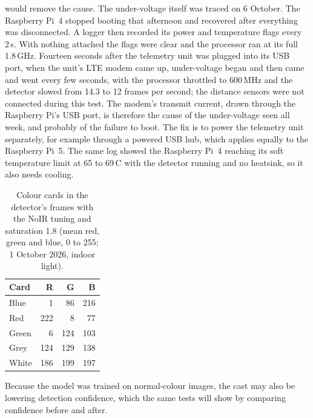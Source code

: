 would remove the cause. The under-voltage itself was traced on 6 October. The Raspberry Pi~4 stopped booting that afternoon and recovered after everything was disconnected. A logger then recorded its power and temperature flags every 2\,s. With nothing attached the flags were clear and the processor ran at its full 1.8\,GHz. Fourteen seconds after the telemetry unit was plugged into its USB port, when the unit's LTE modem came up, under-voltage began and then came and went every few seconds, with the processor throttled to 600\,MHz and the detector slowed from 14.3 to 12 frames per second; the distance sensors were not connected during this test. The modem's transmit current, drawn through the Raspberry Pi's USB port, is therefore the cause of the under-voltage seen all week, and probably of the failure to boot. The fix is to power the telemetry unit separately, for example through a powered USB hub, which applies equally to the Raspberry Pi~5. The same log showed the Raspberry Pi~4 reaching its soft temperature limit at 65 to 69\,\textdegree C with the detector running and no heatsink, so it also needs cooling.

\begin{table}[htbp]
\centering
\caption{Colour cards in the detector's frames with the NoIR tuning and saturation 1.8 (mean red, green and blue, 0 to 255; 1 October 2026, indoor light).}
\label{tab:colour-cards}
\begin{tabular}{lrrr}
\hline
Card & R & G & B \\
\hline
Blue & 1 & 86 & 216 \\
Red & 222 & 8 & 77 \\
Green & 6 & 124 & 103 \\
Grey & 124 & 129 & 138 \\
White & 186 & 199 & 197 \\
\hline
\end{tabular}
\end{table} Because the model was trained on normal-colour images, the cast may also be lowering detection confidence, which the same tests will show by comparing confidence before and after.

